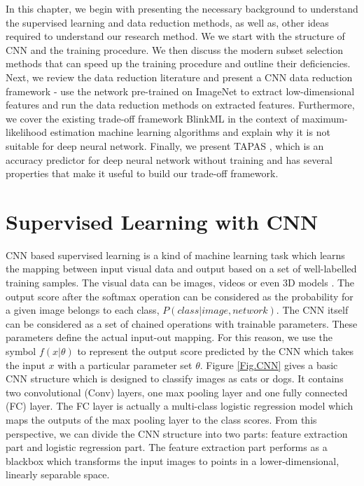 In this chapter, we begin with presenting the necessary background to understand the supervised learning and data reduction methods, as well as, other ideas required to understand our research method.  We we start with the structure of CNN and the training procedure. We then discuss the modern subset selection methods that can speed up the training procedure and outline their deficiencies. Next, we review the data reduction literature and present a CNN data reduction framework - use the network pre-trained on ImageNet to extract low-dimensional features and run the data reduction methods on extracted features. Furthermore, we cover the existing trade-off framework BlinkML \cite{Park2019a} in the context of maximum-likelihood estimation machine learning algorithms and explain why it is not suitable for deep neural network. Finally, we present TAPAS \cite{Istrate2019}, which is an accuracy predictor for deep neural network without training and has several properties that make it useful to build our trade-off framework.

\section{Supervised Learning with CNN}
\label{slcnn}
CNN based supervised learning is a kind of machine learning task which learns the mapping between input visual data and output based on a set of well-labelled training samples. The visual data can be images, videos or even 3D models \cite{Song2020}. The output score after the softmax operation can be considered as the probability for a given image belongs to each class, $P(class|image, network)$. The CNN itself can be considered as a set of chained operations with trainable parameters. These parameters define the actual input-out mapping. For this reason, we use the symbol $f(x|\theta)$ to represent the output score predicted by the CNN which takes the input $x$ with a particular parameter set $\theta$. Figure \ref{Fig.CNN} gives a basic CNN structure which is designed to classify images as cats or dogs. It contains two convolutional (Conv) layers, one max pooling layer and one fully connected (FC) layer. The FC layer is actually a multi-class logistic regression model which maps the outputs of the max pooling layer to the class scores. From this perspective, we can divide the CNN structure into two parts: feature extraction part and logistic regression part. The feature extraction part performs as a blackbox which transforms the input images to points in a lower-dimensional, linearly separable space.

